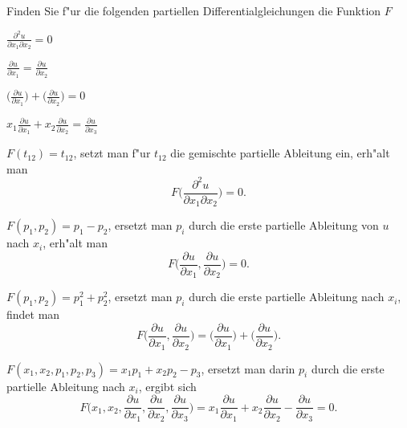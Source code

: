 Finden Sie f"ur die folgenden partiellen Differentialgleichungen die
Funktion $F$
\begin{teilaufgaben}
\item $\displaystyle\frac{\partial^2 u}{\partial x_1\partial x_2}=0$
\item $\displaystyle\frac{\partial u}{\partial x_1}=\frac{\partial u}{\partial x_2}$
\item $\displaystyle
\biggl(\frac{\partial u}{\partial x_1}\biggr)+
\biggl(\frac{\partial u}{\partial x_2}\biggr)=0$
\item $\displaystyle
x_1\frac{\partial u}{\partial x_1}+
x_2\frac{\partial u}{\partial x_2}=\frac{\partial u}{\partial x_3}$
\end{teilaufgaben}

\begin{loesung}
\begin{teilaufgaben}
\item $F(t_{12})=t_{12}$, setzt man f"ur $t_{12}$ die gemischte partielle
Ableitung ein, erh"alt man
\[
F\biggl(\frac{\partial^2 u}{\partial x_1\partial x_2}\biggr)=0.
\]
\item
$F(p_1,p_2)=p_1-p_2$, ersetzt man $p_i$ durch die erste 
partielle Ableitung von $u$ nach $x_i$, erh"alt man
\[
F\biggl(\frac{\partial u}{\partial x_1},\frac{\partial u}{\partial x_2}\biggr)=0.
\]
\item
$F(p_1,p_2)=p_1^2+p_2^2$, ersetzt man $p_i$ durch die erste partielle
Ableitung nach $x_i$, findet man
\[
F\biggl(
\frac{\partial u}{\partial x_1},
\frac{\partial u}{\partial x_2}
\biggr)
=
\biggl(\frac{\partial u}{\partial x_1}\biggr)+
\biggl(\frac{\partial u}{\partial x_2}\biggr).
\]
\item
$F(x_1,x_2,p_1,p_2,p_3)=x_1p_1+x_2p_2-p_3$, ersetzt man darin $p_i$ durch
die erste partielle Ableitung nach $x_i$, ergibt sich
\[
F\biggl(x_1,x_2,
\frac{\partial u}{\partial x_1},
\frac{\partial u}{\partial x_2},
\frac{\partial u}{\partial x_3}\biggr)=
x_1\frac{\partial u}{\partial x_1}+
x_2\frac{\partial u}{\partial x_2}-\frac{\partial u}{\partial x_3}=0.
\]
\end{teilaufgaben}
\end{loesung}
